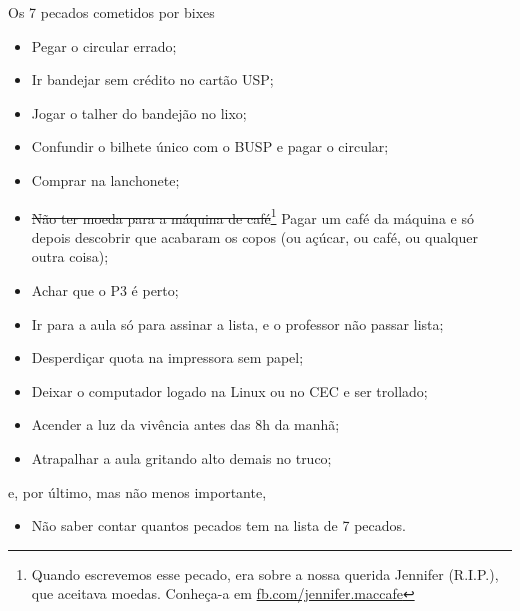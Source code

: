 \begin{editorial}{Os 7 pecados cometidos por bixes}
\begin{itemize}
  \item Pegar o circular errado;
  \item Ir bandejar sem crédito no cartão USP;
  \item Jogar o talher do bandejão no lixo;
  \item Confundir o bilhete único com o BUSP e pagar o circular;
  \item Comprar na lanchonete;
  \item \sout{Não ter moeda para a máquina de café}\footnote{Quando escrevemos
    esse pecado, era sobre a nossa querida Jennifer (R.I.P.), que aceitava
    moedas. Conheça-a em \url{fb.com/jennifer.maccafe}} Pagar um café da
    máquina e só depois descobrir que acabaram os copos (ou açúcar, ou café,
    ou qualquer outra coisa);
  \item Achar que o P3 é perto;
  \item Ir para a aula só para assinar a lista, e o professor não passar lista;
  \item Desperdiçar quota na impressora sem papel;
  \item Deixar o computador logado na Linux ou no CEC e ser trollado;
  \item Acender a luz da vivência antes das 8h da manhã;
  \item Atrapalhar a aula gritando alto demais no truco;
\end{itemize}
e, por último, mas não menos importante,
\begin{itemize}
  \item Não saber contar quantos pecados tem na lista de 7 pecados.
\end{itemize}

\end{editorial}
